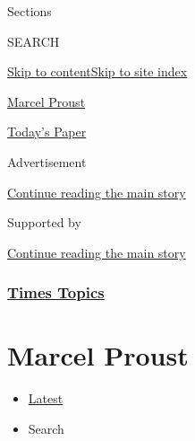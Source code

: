 Sections

SEARCH

\protect\hyperlink{site-content}{Skip to
content}\protect\hyperlink{site-index}{Skip to site index}

\href{https://www.nytimes3xbfgragh.onion/topic/person/marcel-proust}{Marcel
Proust}

\href{https://myaccount.nytimes3xbfgragh.onion/auth/login?response_type=cookie\&client_id=vi}{}

\href{https://www.nytimes3xbfgragh.onion/section/todayspaper}{Today's
Paper}

Advertisement

\protect\hyperlink{after-top}{Continue reading the main story}

Supported by

\protect\hyperlink{after-sponsor}{Continue reading the main story}

\hypertarget{times-topics}{%
\subsubsection{\texorpdfstring{\href{/index.html}{Times
Topics}}{Times Topics}}\label{times-topics}}

\hypertarget{marcel-proust}{%
\section{Marcel Proust}\label{marcel-proust}}

\begin{itemize}
\tightlist
\item
  \protect\hyperlink{stream-panel}{Latest}
\item
  Search
\end{itemize}

